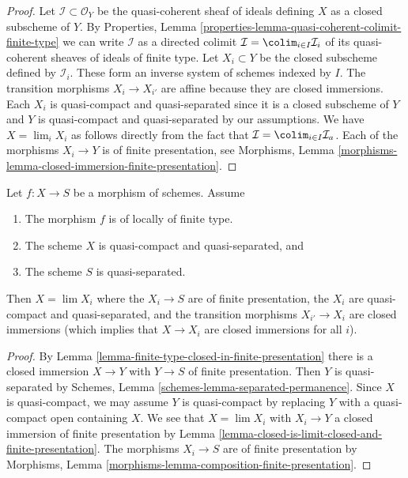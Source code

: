 \begin{proof}
Let $\mathcal{I} \subset \mathcal{O}_Y$ be the quasi-coherent sheaf of
ideals defining $X$ as a closed subscheme of $Y$. By
Properties, Lemma \ref{properties-lemma-quasi-coherent-colimit-finite-type}
we can write $\mathcal{I}$ as a directed colimit
$\mathcal{I} = \colim_{i \in I} \mathcal{I}_i$ of its
quasi-coherent sheaves of ideals of finite type.
Let $X_i \subset Y$ be the closed subscheme defined by $\mathcal{I}_i$.
These form an inverse system of schemes indexed by $I$.
The transition morphisms $X_i \to X_{i'}$ are affine because
they are closed immersions. Each $X_i$ is quasi-compact and quasi-separated
since it is a closed subscheme of $Y$ and $Y$ is quasi-compact and
quasi-separated by our assumptions.
We have $X = \lim_i X_i$ as follows directly from the
fact that $\mathcal{I} = \colim_{i \in I} \mathcal{I}_a$.
Each of the morphisms $X_i \to Y$ is of finite presentation, see
Morphisms, Lemma \ref{morphisms-lemma-closed-immersion-finite-presentation}.
\end{proof}

\begin{lemma}
\label{lemma-finite-type-is-limit-finite-presentation}
Let $f : X \to S$ be a morphism of schemes. Assume
\begin{enumerate}
\item The morphism $f$ is of locally of finite type.
\item The scheme $X$ is quasi-compact and quasi-separated, and
\item The scheme $S$ is quasi-separated.
\end{enumerate}
Then $X = \lim X_i$ where the $X_i \to S$ are of
finite presentation, the $X_i$ are quasi-compact and quasi-separated,
and the transition morphisms $X_{i'} \to X_i$ are closed immersions
(which implies that $X \to X_i$ are closed immersions for all $i$).
\end{lemma}

\begin{proof}
By Lemma \ref{lemma-finite-type-closed-in-finite-presentation}
there is a closed immersion $X \to Y$ with $Y \to S$ of
finite presentation. Then $Y$ is quasi-separated by
Schemes, Lemma \ref{schemes-lemma-separated-permanence}.
Since $X$ is quasi-compact, we may assume
$Y$ is quasi-compact by replacing $Y$ with a quasi-compact open
containing $X$. We see that $X = \lim X_i$ with $X_i \to Y$ a closed
immersion of finite presentation by
Lemma \ref{lemma-closed-is-limit-closed-and-finite-presentation}.
The morphisms $X_i \to S$ are of finite presentation by
Morphisms, Lemma \ref{morphisms-lemma-composition-finite-presentation}.
\end{proof}

